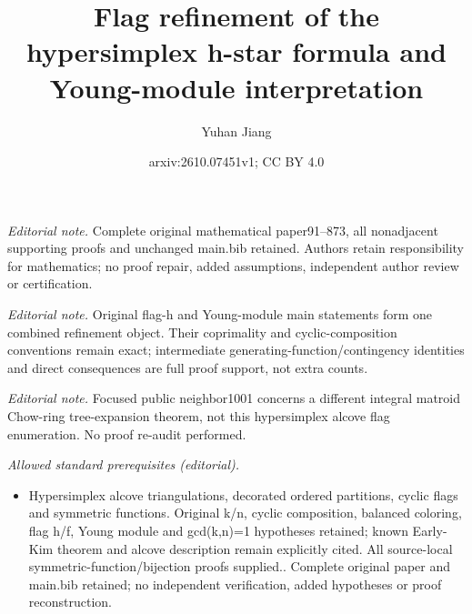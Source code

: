 \documentclass[10pt,a4paper]{amsart}
\title{Flag refinement of the hypersimplex h-star formula and Young-module interpretation}
\author{Yuhan Jiang}
\date{arxiv:2610.07451v1; CC BY 4.0}
\theoremstyle{plain}
\theoremstyle{definition}
\begin{document}
\maketitle
\noindent\textit{Editorial note.} Complete original mathematical paper91--873, all nonadjacent supporting proofs and unchanged main.bib retained. Authors retain responsibility for mathematics; no proof repair, added assumptions, independent author review or certification.\par\medskip
\noindent\textit{Editorial note.} Original flag-h and Young-module main statements form one combined refinement object. Their coprimality and cyclic-composition conventions remain exact; intermediate generating-function/contingency identities and direct consequences are full proof support, not extra counts.\par\medskip
\noindent\textit{Editorial note.} Focused public neighbor1001 concerns a different integral matroid Chow-ring tree-expansion theorem, not this hypersimplex alcove flag enumeration. No proof re-audit performed.\par\medskip
\noindent\textit{Allowed standard prerequisites (editorial).}\begin{itemize}
\item Hypersimplex alcove triangulations, decorated ordered partitions, cyclic flags and symmetric functions. Original k/n, cyclic composition, balanced coloring, flag h/f, Young module and gcd(k,n)=1 hypotheses retained; known Early-Kim theorem and alcove description remain explicitly cited. All source-local symmetric-function/bijection proofs supplied.. Complete original paper and main.bib retained; no independent verification, added hypotheses or proof reconstruction.
\end{itemize}\medskip
\end{document}
